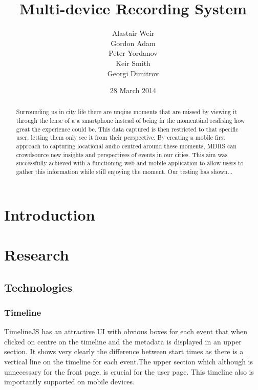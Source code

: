 \documentclass{l3proj}
\begin{document}
\title{Multi-device Recording System}
\author{Alastair Weir \\
        Gordon Adam \\
        Peter Yordanov \\
        Keir Smith \\
        Georgi Dimitrov}
\date{28 March 2014}
\maketitle
\begin{abstract}

Surrounding us in city life there are unqiue moments that are missed by viewing it through the lense of a a smartphone instead of being \'in the moment\' and realising how great the experience could be. This data captured is then restricted to that specific user, letting them only see it from their perspective. By creating a mobile first approach to capturing locational audio centred around these moments, MDRS can crowdsource new insights and perspectives of events in our cities. This aim was successfully achieved with a functioning web and mobile application to allow users to gather this information while still enjoying the moment. Our testing has shown...

\end{abstract}
\educationalconsent
\tableofcontents
\chapter{Introduction}
\label{intro}

\chapter{Research}
\label{Research}

\section{Technologies}

\subsection{Timeline}

TimelineJS has an attractive UI with obvious boxes for each event that when clicked on centre on the timeline and the metadata is displayed in an upper section. It shows very clearly the difference between start times as there is a vertical line on the timeline for each event.The upper section which although is unnecessary for the front page, is crucial for the user page. This timeline also is importantly supported on mobile devices.
\end{document}
